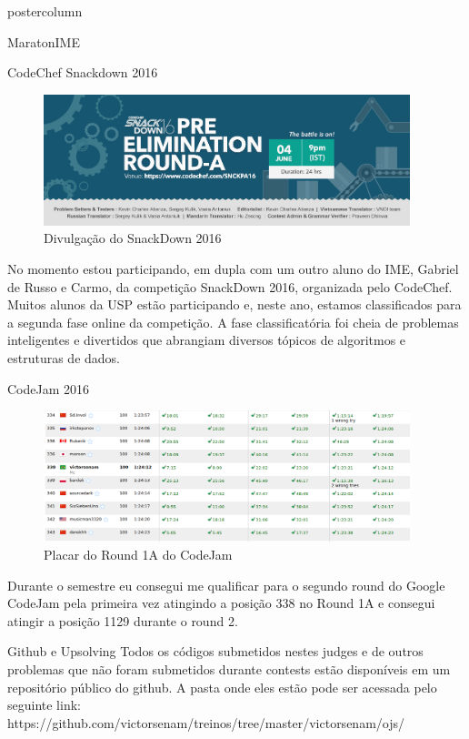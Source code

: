\documentclass[final]{beamer}
\begin{document}
\begin{frame}
\begin{columns}
\begin{column}{.5\textwidth}
\begin{beamercolorbox}[center,wd=\textwidth]{postercolumn}
\begin{minipage}[T]{.95\textwidth}
{\begin{block}{MaratonIME}
        \end{block}
    \begin{block}{CodeChef Snackdown 2016}
        \begin{figure}[htp]
        \centering
        \includegraphics[width=0.95\textwidth]{snackdown.jpg}
    \caption{Divulgação do SnackDown 2016}
    \end{figure}
    No momento estou participando, em dupla com um outro aluno do IME, Gabriel de Russo e Carmo, da competição SnackDown 2016, organizada pelo CodeChef. Muitos alunos da USP estão participando e, neste ano, estamos classificados para a segunda fase online da competição. A fase classificatória foi cheia de problemas inteligentes e divertidos que abrangiam diversos tópicos de algoritmos e estruturas de dados.
        \end{block}
    \begin{block}{CodeJam 2016}
        \begin{figure}[htp]
        \centering
        \includegraphics[width=0.95\textwidth]{codejam.png}
    \caption{Placar do Round 1A do CodeJam}
    \end{figure}
    Durante o semestre eu consegui me qualificar para o segundo round do Google CodeJam pela primeira vez atingindo a posição 338 no Round 1A e consegui atingir a posição 1129 durante o round 2. 
        \end{block}
    \begin{block}{Github e Upsolving}
    Todos os códigos submetidos nestes judges e de outros problemas que não foram submetidos durante contests estão disponíveis em um repositório público do github. A pasta onde eles estão pode ser acessada pelo seguinte link:  https://github.com/victorsenam/treinos/tree/master/victorsenam/ojs/ \\
        \end{block}
    \vfill
}
\end{minipage}
\end{beamercolorbox}
\end{column}



\end{columns}
\end{frame}
\end{document}
